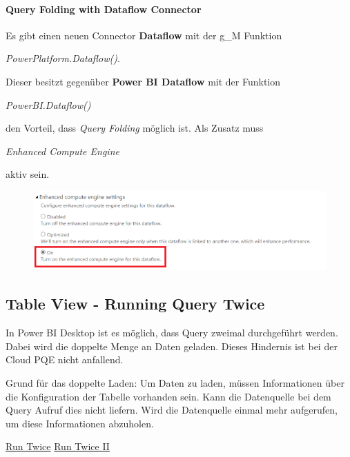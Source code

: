 \paragraph{Query Folding with Dataflow Connector}
Es gibt einen neuen Connector \textbf{Dataflow} mit der \gls{g_M} Funktion
\begin{center}
	\textit{PowerPlatform.Dataflow()}.
\end{center}
Dieser besitzt gegenüber \textbf{Power BI Dataflow} mit der Funktion
\begin{center}
	\textit{PowerBI.Dataflow()}
\end{center}
den Vorteil, dass \textit{Query Folding} möglich ist. Als Zusatz muss 
\begin{center}
	\textit{Enhanced Compute Engine}
\end{center}
aktiv sein.
\begin{figure}[H]
	\centering
	\includegraphics[scale = 0.3]{attachment/chapter_1/Scc165}
\end{figure}

\subsection{Table View - Running Query Twice}
In Power BI Desktop ist es möglich, dass Query zweimal durchgeführt werden. Dabei wird die doppelte Menge an Daten geladen. Dieses Hindernis ist bei der Cloud \gls{PQE} nicht anfallend.

Grund für das doppelte Laden: Um Daten zu laden, müssen Informationen über die Konfiguration der Tabelle vorhanden sein. Kann die Datenquelle bei dem Query Aufruf dies nicht liefern. Wird die Datenquelle einmal mehr aufgerufen, um diese Informationen abzuholen.

\href{https://blog.crossjoin.co.uk/2020/05/14/speed-up-data-refresh-performance-in-power-bi-desktop-using-table-view/}{Run Twice}
\href{https://blog.crossjoin.co.uk/2020/07/05/why-is-power-bi-running-my-sql-query-twice/}{Run Twice II}